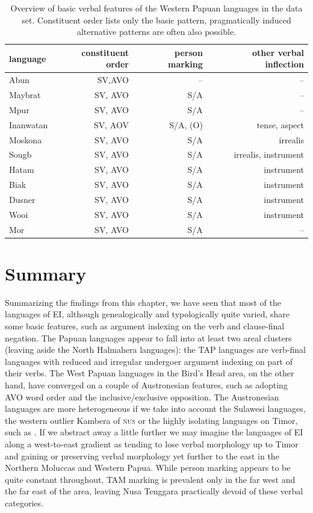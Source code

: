 \begin{table}[h]
\begin{center}
\begin{footnotesize}
\begin{tabular}{l r r r}
\hline\hline
language & constituent order & person marking & other verbal inflection \tabularnewline
\hline
Abun & SV,AVO & -- & -- \tabularnewline
Maybrat & SV, AVO & S/A & -- \tabularnewline
Mpur & SV, AVO & S/A & -- \tabularnewline
Inanwatan & SV, AOV & S/A, (O) & tense, aspect \tabularnewline
\hline
Moskona & SV, AVO & S/A & irrealis \tabularnewline
Sougb & SV, AVO & S/A & irrealis, instrument \tabularnewline
Hatam & SV, AVO & S/A & instrument \tabularnewline
\hline
Biak & SV, AVO & S/A & instrument \tabularnewline
Dusner & SV, AVO & S/A & instrument \tabularnewline
Wooi & SV, AVO & S/A & instrument \tabularnewline
Mor & SV, AVO & S/A & -- \tabularnewline
\hline
\end{tabular}
\caption[Basic verbal features of the Western Papuan languages]{Overview of basic verbal features of the Western Papuan languages in the data set. Constituent order lists only the basic pattern, pragmatically induced alternative patterns are often also possible.}
\label{table:overviewpapua}
\end{footnotesize}
\end{center}
\end{table}
\FloatBarrier

\section{Summary}

Summarizing the findings from this chapter, we have seen that most of the languages of EI, although genealogically and typologically quite varied, share some basic features, such as argument indexing on the verb and clause-final negation. The Papuan languages appear to fall into at least two areal clusters (leaving aside the North Halmahera languages): the TAP languages are verb-final languages with reduced and irregular undergoer argument indexing on part of their verbs. The West Papuan languages in the Bird's Head area, on the other hand, have converged on a couple of Austronesian features, such as adopting AVO word order and the inclusive/exclusive opposition. The Austronesian languages are more heterogeneous if we take into account the Sulawesi languages, the western outlier Kambera of \textsc{nus} or the highly isolating languages on Timor, such as . If we abstract away a little further we may imagine the languages of EI along a west-to-east gradient as tending to lose verbal morphology up to Timor and gaining or preserving verbal morphology yet further to the east in the Northern Moluccas and Western Papua. While person marking appears to be quite constant throughout, TAM marking is prevalent only in the far west and the far east of the area, leaving Nusa Tenggara practically devoid of these verbal categories.

